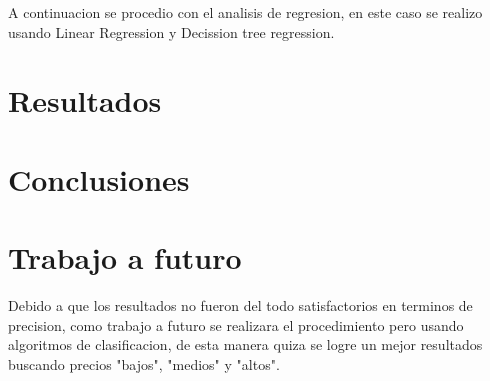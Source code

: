\documentclass[conference]{IEEEtran}
\begin{document}
A continuacion se procedio con el analisis de regresion, en este caso se realizo usando Linear Regression y Decission tree regression.
\section{Resultados}


\section{Conclusiones}
\section{Trabajo a futuro}
Debido a que los resultados no fueron del todo satisfactorios en terminos de precision, como trabajo a futuro se realizara el procedimiento pero usando algoritmos de clasificacion, de esta manera quiza se logre un mejor resultados buscando precios "bajos", "medios" y "altos".
\vspace{5mm} %


\cite{Schwarzova_undated-cm,Schwarzova2020-ud,Kalehbasti2020-sk}
\end{document}
